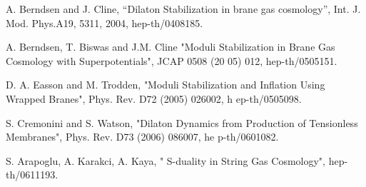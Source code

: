 \documentclass[aps,floatfix,twocolumn,amsmath]{revtex4}
\begin{document}
\begin{thebibliography}{100}
 A. Berndsen and J. Cline, ``Dilaton Stabilization in
brane gas cosmology'', Int. J. Mod. Phys.A19, 5311, 2004, hep-th/0408185.

  A. Berndsen, T. Biswas and J.M. Cline "Moduli Stabilization in Brane Gas Cosmology with Superpotentials", JCAP 0508 (20
05) 012, hep-th/0505151.

  D. A. Easson and M. Trodden, "Moduli Stabilization and Inflation Using Wrapped Branes", Phys. Rev. D72 (2005) 026002, h
ep-th/0505098.

 S. Cremonini and  S.  Watson, "Dilaton Dynamics from Production of Tensionless Membranes", Phys. Rev. D73 (2006) 086007, he
p-th/0601082.


   S. Arapoglu, A. Karakci, A. Kaya, " S-duality in String Gas Cosmology",  hep-th/0611193.


\end{thebibliography}
\end{document}
